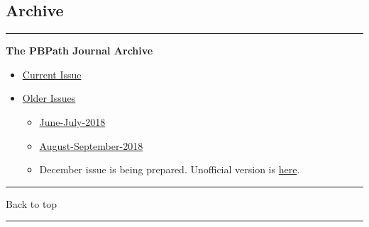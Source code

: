 \documentclass[]{article}
\begin{document}
\hypertarget{archive}{%
\subsection{Archive}\label{archive}}

\begin{center}\rule{0.5\linewidth}{\linethickness}\end{center}

\textbf{The PBPath Journal Archive}

\begin{itemize}
\item
  \href{http://pbpath.org/journal-watch/}{Current Issue}
\item
  \href{http://pbpath.org/journal-watch-archive/}{Older Issues}

  \begin{itemize}
  \item
    \href{http://pbpath.org/pbpath-journal-watch-june-july-2018/}{June-July-2018}
  \item
    \href{http://pbpath.org/pbpath-journal-watch-august-september-2018/}{August-September-2018}
  \item
    December issue is being prepared. Unofficial version is
    \href{http://pbpath.org/journal-watch-upcoming-issue/}{here}.
  \end{itemize}
\end{itemize}

\begin{center}\rule{0.5\linewidth}{\linethickness}\end{center}

Back to top

\begin{center}\rule{0.5\linewidth}{\linethickness}\end{center}

\pagebreak
\end{document}
